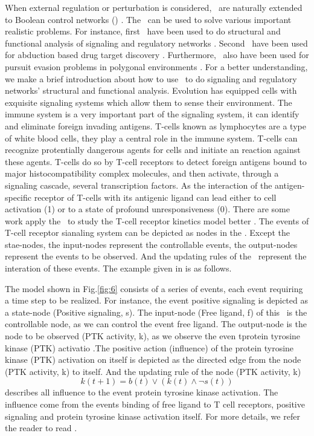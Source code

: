 When external regulation or perturbation is considered, \BNs\ are naturally extended to Boolean control networks (\BCNs) \cite{Ideker2001A}. The \BCNs\ can be used to solve various important realistic problems. For instance, first \BCNs\ have been used to do structural and functional analysis of  signaling and regulatory networks \cite{Kaufman1999A, Klamt2006A}. Second \BCNs\ have been used for abduction based drug target discovery \cite{Biane2017Abduction}. Furthermore, \BCNs\ also have been used for pursuit evasion problems in polygonal environments \cite{Thunberg2011A}. For a better understanding, we make a brief introduction about how to use \BCNs\ to do signaling and regulatory networks' structural and functional analysis. Evolution has equipped cells with exquisite signaling systems which allow them to sense their environment. The immune system is a very important part of the signaling system, it can identify and eliminate foreign invading antigens. T-cells known as lymphocytes are a type of white blood cells, they play a central role in the immune system. T-cells can recognize protentially dangerous agents for cells and initiate an reaction against these agents. T-cells do so by T-cell receptors to detect foreign antigens bound to major histocompatibility complex molecules, and then activate, through a signaling cascade, several transcription factors. As the interaction of the antigen-specific receptor of T-cells with its antigenic ligand can lead either to cell activation (1) or to a state of profound unresponsiveness (0). There are some work  apply the \BCNs\ to study the T-cell receptor kinetics model better \cite{Kaufman1999A, Klamt2006A}. The events of T-cell receptor sianaling system can be depicted as nodes in the \BCN. Except the stae-nodes, the input-nodes represent the controllable events, the output-nodes represent the events to be observed. And the updating rules of the \BCN\ represent the interation of these events. The example given in \cite{Kaufman1999A} is as follows.
 \begin{example}The model shown in Fig.\ref{fig:6} consists of a series of events, each event requiring a time step to be realized. For instance, the event positive signaling is depicted as a state-node (Positive signaling, s). The input-node (Free ligand, f) of this \BCN\ is the controllable node, as we can control the event free ligand. The output-node is the node to be observed (PTK activity, k), as we observe the even tprotein tyrosine kinase (PTK) activatio .The positive action (influence) of the protein tyrosine kinase (PTK) activation on itself is depicted as the directed edge from the node (PTK activity, k) to itself. And the updating rule of the node (PTK activity, k)  
 \[k(t+1)=b(t)\vee (k(t)\wedge\neg s(t) )\] 
 describes all influence to the event protein tyrosine kinase activation. The influence come from the events binding of free ligand to T cell receptors, positive signaling and protein tyrosine kinase activation itself. For more details, we refer the reader to read \cite{Kaufman1999A, Klamt2006A}. 
\end{example}  


